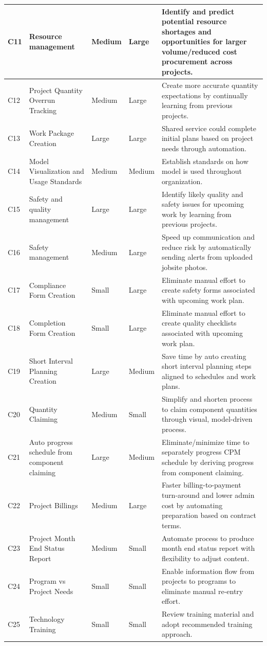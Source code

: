 \documentclass[11pt, letterpaper]{article}
\begin{document}
{\begin{tabularx}{\textwidth}{@{} >{\raggedright\arraybackslash}p{0.9cm} >{\raggedright\arraybackslash}p{3.8cm} >{\raggedright\arraybackslash}p{1.3cm} >{\raggedright\arraybackslash}p{1.3cm} X @{}}
\midrule
C11 & Resource management & Medium & Large & Identify and predict potential resource shortages and opportunities for larger volume/reduced cost procurement across projects. \\
\midrule
C12 & Project Quantity Overrun Tracking & Medium & Large & Create more accurate quantity expectations by continually learning from previous projects. \\
\midrule
C13 & Work Package Creation & Large & Large & Shared service could complete initial plans based on project needs through automation. \\
\midrule
C14 & Model Visualization and Usage Standards & Medium & Medium & Establish standards on how model is used throughout organization. \\
\midrule
C15 & Safety and quality management & Large & Large & Identify likely quality and safety issues for upcoming work by learning from previous projects. \\
\midrule
C16 & Safety management & Medium & Large & Speed up communication and reduce risk by automatically sending alerts from uploaded jobsite photos. \\
\midrule
C17 & Compliance Form Creation & Small & Large & Eliminate manual effort to create safety forms associated with upcoming work plan. \\
\midrule
C18 & Completion Form Creation & Small & Large & Eliminate manual effort to create quality checklists associated with upcoming work plan. \\
\midrule
C19 & Short Interval Planning Creation & Large & Medium & Save time by auto creating short interval planning steps aligned to schedules and work plans. \\
\midrule
C20 & Quantity Claiming & Medium & Small & Simplify and shorten process to claim component quantities through visual, model-driven process. \\
\midrule
C21 & Auto progress schedule from component claiming & Large & Medium & Eliminate/minimize time to separately progress CPM schedule by deriving progress from component claiming. \\
\midrule
C22 & Project Billings & Medium & Large & Faster billing-to-payment turn-around and lower admin cost by automating preparation based on contract terms. \\
\midrule
C23 & Project Month End Status Report & Medium & Small & Automate process to produce month end status report with flexibility to adjust content. \\
\midrule
C24 & Program vs Project Needs & Small & Small & Enable information flow from projects to programs to eliminate manual re-entry effort. \\
\midrule
C25 & Technology Training & Small & Small & Review training material and adopt recommended training approach. \\
\bottomrule
\end{tabularx}
}
\end{document}
